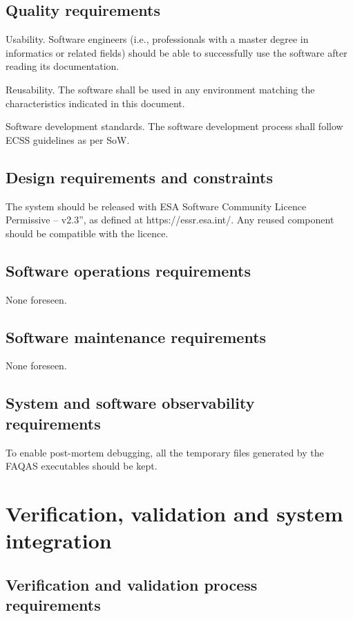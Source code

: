 \subsection{Quality requirements}

\RQ{} Usability. Software engineers (i.e., professionals with a master degree in informatics or related fields) should be able to successfully use the software after reading its documentation.

\RQ{} Reusability. The software shall be used in any environment matching the characteristics indicated in this document.

\RQ{} Software development standards. The software development process shall follow ECSS guidelines as per SoW.

\subsection{Design requirements and constraints}

\RQ{} The system should be released with ESA Software Community Licence Permissive – v2.3”, as defined at https://essr.esa.int/. Any reused component should be compatible with the licence.

\subsection{Software operations requirements}

None foreseen.

\subsection{Software maintenance requirements}

None foreseen.

\subsection{System and software observability requirements}

\RQ{} To enable post-mortem debugging, all the temporary files generated by the FAQAS executables should be kept.

\section{Verification, validation and system integration}
 \subsection{Verification and validation process requirements}
 
